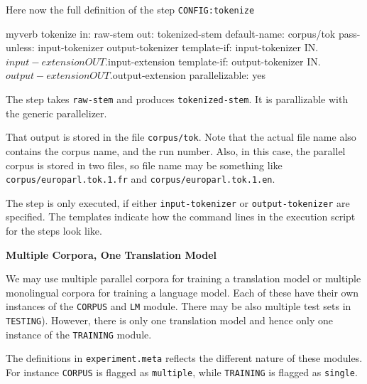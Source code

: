 Here now the full definition of the step {\tt CONFIG:tokenize}






\begin{SaveVerbatim}{myverb}
 tokenize
        in: raw-stem
        out: tokenized-stem
        default-name: corpus/tok
        pass-unless: input-tokenizer output-tokenizer
        template-if: input-tokenizer IN.$input-extension OUT.$input-extension
        template-if: output-tokenizer IN.$output-extension OUT.$output-extension
        parallelizable: yes
\end{SaveVerbatim}
\colorbox{gray}{%
}

The step takes {\tt raw-stem} and produces {\tt tokenized-stem}. It is parallizable with the generic parallelizer.



That output is stored in the file {\tt corpus/tok}. Note that the actual file name also contains the corpus name, and the run number. Also, in this case, the parallel corpus is stored in two files, so file name may be something like {\tt corpus/europarl.tok.1.fr} and {\tt corpus/europarl.tok.1.en}. 



The step is only executed, if either {\tt input-tokenizer} or {\tt output-tokenizer} are specified. The templates indicate how the command lines in the execution script for the steps look like.



\label{experiment-perl.texmultiple-sections}


\vspace{2mm}

{\bf 
\label{experiment-perl.texntoc18}Multiple Corpora, One Translation Model}


We may use multiple parallel corpora for training a translation model or multiple monolingual corpora for training a language model. Each of these have their own instances of the {\tt CORPUS} and {\tt LM} module. There may be also multiple test sets in {\tt TESTING}). However, there is only one translation model and hence only one instance of the {\tt TRAINING} module. 



The definitions in {\tt experiment.meta} reflects the different nature of these modules. For instance {\tt CORPUS} is flagged as {\tt multiple}, while {\tt TRAINING} is flagged as {\tt single}.



